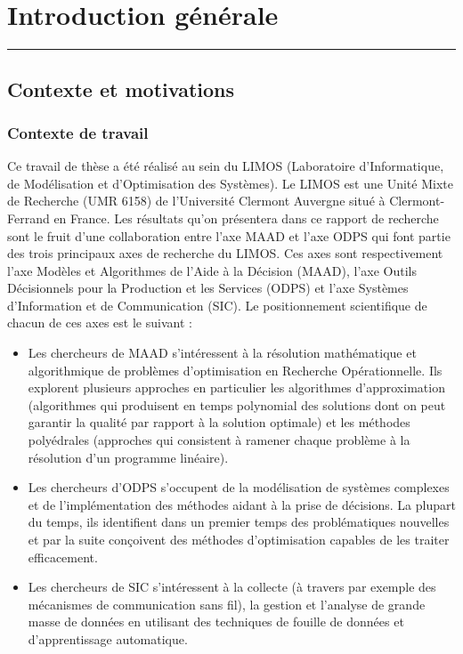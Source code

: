 \chapter{Introduction générale}%
\minitoc
\newpage
\rule{\linewdith}{1pt}
\section{Contexte et motivations}

\subsection{Contexte de travail}%
Ce travail de thèse a été réalisé au sein du LIMOS (Laboratoire d'Informatique, de Modélisation et d'Optimisation des Systèmes). Le LIMOS est une Unité Mixte de Recherche (UMR 6158) de l'Université Clermont Auvergne situé à Clermont-Ferrand en France.
Les résultats qu'on présentera dans ce rapport de recherche sont le fruit d'une collaboration entre l'axe MAAD et l'axe ODPS qui font partie des trois principaux axes de recherche du LIMOS. Ces axes sont respectivement l'axe Modèles et Algorithmes de l'Aide à la Décision (MAAD), l'axe Outils Décisionnels pour la Production et les Services (ODPS) et l'axe  Systèmes d'Information et de Communication (SIC). Le positionnement scientifique de chacun de ces axes est le suivant :
\begin{itemize}[label=$\square$]
	
	
	\item Les chercheurs de MAAD s'intéressent à la résolution mathématique et algorithmique de problèmes d'optimisation \cite{wilde1967foundations} en Recherche Opérationnelle. Ils explorent plusieurs approches en particulier les algorithmes d'approximation (algorithmes qui produisent en temps polynomial des solutions dont on peut garantir la qualité par rapport à la solution optimale) et les méthodes polyédrales (approches qui consistent à ramener chaque problème à la résolution d'un programme linéaire). 


	\item Les chercheurs d'ODPS s'occupent de la modélisation de systèmes complexes et de l'implémentation des méthodes aidant à la prise de décisions. La plupart du temps, ils identifient dans un premier temps des problématiques nouvelles et par la suite conçoivent des méthodes d'optimisation capables de les traiter efficacement. 
	
	\item Les chercheurs de SIC s'intéressent à la collecte (à travers par exemple des mécanismes de communication sans fil), la gestion et l'analyse de grande masse de données en utilisant des techniques de fouille de données et d'apprentissage automatique.
\end{itemize}


